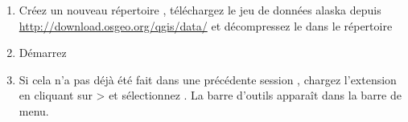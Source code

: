 \begin{enumerate}
  \item Créez un nouveau répertoire , téléchargez le jeu de données \qg alaska  depuis \url{http://download.osgeo.org/qgis/data/} et décompressez le dans le répertoire 
  \item Démarrez \qg
  \item Si cela n'a pas déjà été fait dans une précédente session \qg, chargez l'extension \grass en cliquant sur  >  et sélectionnez \dropmenuopt{\grass}. La barre d'outils \grass apparaît dans la barre de menu.

\end{enumerate}
